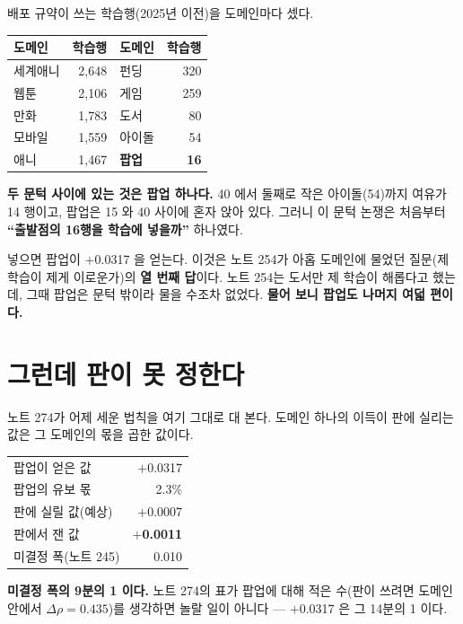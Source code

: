 \documentclass[10pt]{article}
\begin{document}
배포 규약이 쓰는 학습행(2025년 이전)을 도메인마다 셌다.

\begin{center}\small
\begin{tabular}{lr@{\qquad}lr}
\hline
도메인 & 학습행 & 도메인 & 학습행 \\
\hline
세계애니 & 2,648 & 펀딩 & 320 \\
웹툰 & 2,106 & 게임 & 259 \\
만화 & 1,783 & 도서 & 80 \\
모바일 & 1,559 & 아이돌 & 54 \\
애니 & 1,467 & \textbf{팝업} & \textbf{16} \\
\hline
\end{tabular}
\end{center}

\textbf{두 문턱 사이에 있는 것은 팝업 하나다.} 40 에서 둘째로 작은
아이돌(54)까지 여유가 14 행이고, 팝업은 15 와 40 사이에 혼자 앉아 있다.
그러니 이 문턱 논쟁은 처음부터 \textbf{``출발점의 16행을 학습에 넣을까''}
하나였다.

넣으면 팝업이 $+$0.0317 을 얻는다. 이것은 노트 254가 아홉 도메인에 물었던
질문(제 학습이 제게 이로운가)의 \textbf{열 번째 답}이다. 노트 254는
도서만 제 학습이 해롭다고 했는데, 그때 팝업은 문턱 밖이라 물을 수조차
없었다. \textbf{물어 보니 팝업도 나머지 여덟 편이다.}

\section{그런데 판이 못 정한다}

노트 274가 어제 세운 법칙을 여기 그대로 대 본다. 도메인 하나의 이득이
판에 실리는 값은 그 도메인의 몫을 곱한 값이다.

\begin{center}\small
\begin{tabular}{lr}
\hline
팝업이 얻은 값 & $+$0.0317 \\
팝업의 유보 몫 & 2.3\% \\
판에 실릴 값(예상) & $+$0.0007 \\
\hline
판에서 잰 값 & \textbf{$+$0.0011} \\
미결정 폭(노트 245) & 0.010 \\
\hline
\end{tabular}
\end{center}

\textbf{미결정 폭의 9분의 1 이다.} 노트 274의 표가 팝업에 대해 적은
수(판이 쓰려면 도메인 안에서 $\Delta\rho{=}0.435$)를 생각하면 놀랄 일이
아니다 --- $+$0.0317 은 그 14분의 1 이다.
\end{document}
